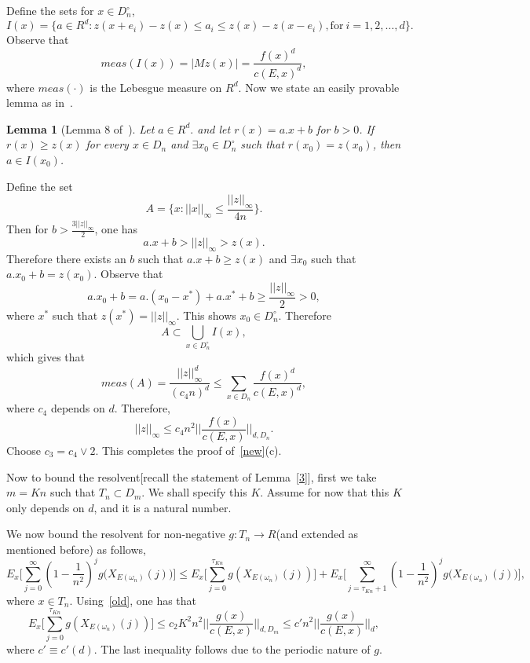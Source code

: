 \documentclass[final]{aomart}
\def\mathscr#1{#1}%
\def\mathbb#1{#1}%
\theoremstyle{plain}
\newtheorem{lemma}[theorem]{Lemma}
\theoremstyle{definition}
\theoremstyle{remark}
\begin{document}
Define the sets for $x \in D_n^{\circ}$,\[
I(x) = \{ a \in \mathbb{R}^d: z(x+e_i) -z(x) \leq a_i \leq z(x) -z(x-e_i), \text{for}~i=1,2,\dots, d\}.
\]
Observe that \[
meas(I(x)) = |Mz(x)|=  \frac{f(x)^d}{c(\mathscr{E},x)^d}, 
\]
where $meas(\cdot)$ is the Lebesgue measure on $\mathbb{R}^d$. 
Now we state an easily provable lemma as in~\cite{Lawler1982}. 
\begin{lemma}[Lemma 8 of~\cite{Lawler1982}]
    Let $a \in \mathbb{R}^d.$ and let $r(x) = a.x +b$ for $b>0$. If $r(x)\geq z(x)$ for every $x\in D_n$ and $\exists x_0 \in D_n ^\circ$ such that $r(x_0)=z(x_0)$, then $a \in I(x_0)$. 

\end{lemma}
Define the set \[
A= \{ x: ||x||_{\infty}\leq \frac{||z||_{\infty}}{4n} \}. 
\]
Then for $b>\frac{3||z||_{\infty}}{2}$, one has \[
a.x+b >||z||_{\infty}>z(x).
\]
Therefore there exists an $b$ such that $a.x+b \geq z(x) $ and $\exists x_0 $ such that $a.x_0 +b= z(x_0)$. Observe that \[
a.x_0 +b = a.(x_0 -x^*) + a.x^*+b \geq \frac{||z||_{\infty}}{2}>0, 
\] where $x^*$ such that $z(x^*) = ||z||_{\infty}$. This shows $x_0 \in D_n^{\circ}$. 
Therefore \[
A \subset \bigcup_{x \in D_n^\circ } I(x),
\] which gives that \[
meas(A) = \frac{||z||^d_{\infty}}{(c_4 n)^d} \leq \sum_{x \in D_n} \frac{f(x)^d}{c(\mathscr{E},x)^d},
\]
where $c_4$ depends on $d$. Therefore,\[
||z||_{\infty}\leq c_4n^2 ||\frac{f(x)}{c(\mathscr{E},x)}||_{d,D_n}.
\]
Choose $c_3= c_4 \vee 2$. This completes the proof of~\ref{new}(c).

Now to bound the resolvent[recall the statement of Lemma~\ref{3}], first we take $m= Kn$ such that $T_n \subset D_m$. We shall specify this $K$. Assume for now that this $K$ only depends on $d$, and it is a natural number.
 
We now bound the resolvent for non-negative $g:T_n\to \mathbb{R}$(and extended as mentioned before) as follows, \[
\mathbb{E}_x\big[\sum_{j=0}^{\infty} \left(1- \frac{1}{n^2}\right) ^j g(X_{\mathscr{E}(\omega_n)}(j)  \big)] \leq  \mathbb{E}_x\big[\sum_{j=0}^{\tau_{Kn}} g(X_{\mathscr{E}(\omega_n)}(j)) \big] + \mathbb{E}_x\big[\sum_{j=\tau_{Kn} +1 }^{\infty} \left(1- \frac{1}{n^2}\right) ^j g(X_{\mathscr{E}(\omega_n)}(j)  \big)],
\]
where $x \in T_n$. 
Using~\ref{old}, one has that \[
\mathbb{E}_x\big[\sum_{j=0}^{\tau_{Kn} } g(X_{\mathscr{E}(\omega_n)}(j)) \big] \leq c_2K^2n^2||\frac{g(x)}{c(\mathscr{E},x)}||_{d,D_m} \leq c'n^2 ||\frac{g(x)}{c(\mathscr{E},x)}||_{d},
\] where $c'\equiv c'(d)$.
The last inequality follows due to the periodic nature of $g$. 
\end{document}
